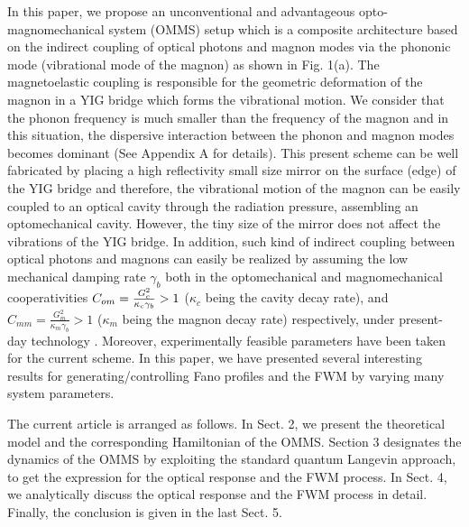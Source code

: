 \documentclass[aps,pra,superscriptaddress,balancelastpage,twocolumn]{revtex4}
\begin{document}
In this paper, we propose an unconventional and advantageous
opto-magnomechanical system (OMMS) setup which is a composite architecture
based on the indirect coupling of optical photons and magnon modes via the
phononic mode (vibrational mode of the magnon) as shown in Fig. 1(a). The
magnetoelastic coupling is responsible for the geometric deformation of the
magnon in a YIG bridge which forms the vibrational motion. We consider that
the phonon frequency is much smaller than the frequency of the magnon and in
this situation, the dispersive interaction between the phonon and magnon
modes becomes dominant (See Appendix A for details). This present scheme can
be well fabricated by placing a high reflectivity small size mirror on the
surface (edge) of the YIG bridge and therefore, the vibrational motion of
the magnon can be easily coupled to an optical cavity through the radiation
pressure, assembling an optomechanical cavity. However, the tiny size of the
mirror does not affect the vibrations of the YIG bridge. In addition, such
kind of indirect coupling between optical photons and magnons can easily be
realized by assuming the low mechanical damping rate $\gamma_{b}$ both in
the optomechanical and magnomechanical cooperativities $C_{om}=\frac{%
G_{c}^{2}}{\kappa_{c}\gamma_{b}}>1$ ($\kappa_{c}$ being the cavity decay
rate), and $C_{mm}=\frac{G_{m}^{2}}{\kappa_{m}\gamma_{b}}>1$ ($\kappa_{m}$
being the magnon decay rate) respectively, under present-day technology \cite%
{Mey,Tang,CAPE}. Moreover, experimentally feasible parameters have been
taken for the current scheme. In this paper, we have presented several
interesting results for generating/controlling Fano profiles and the FWM by
varying many system parameters.

The current article is arranged as follows. In Sect. 2, we present the
theoretical model and the corresponding Hamiltonian of the OMMS. Section 3
designates the dynamics of the OMMS by exploiting the standard quantum
Langevin approach, to get the expression for the optical response and the FWM
process. In Sect. 4, we analytically discuss the optical response and the
FWM process in detail. Finally, the conclusion is given in the last Sect. 5.
\end{document}
